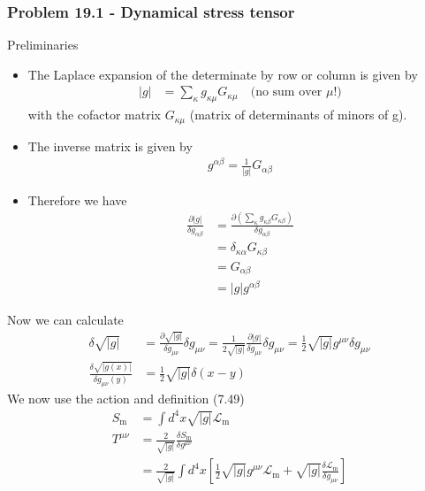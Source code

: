 \documentclass[10pt,a4paper]{article}
\theoremstyle{definition}
\begin{document}
\subsubsection{Problem 19.1 - Dynamical stress tensor}
Preliminaries
\begin{itemize} 
\item The Laplace expansion of the determinate by row or column is given by
\begin{align}
    |g|&=\sum_\kappa g_{\kappa\mu}G_{\kappa\mu}\quad\text{(no sum over $\mu$!)}
\end{align}
with the cofactor matrix $G_{\kappa\mu}$ (matrix of determinants of minors of g).
\item The inverse matrix is given by
\begin{align}
    g^{\alpha\beta}=\frac{1}{|g|}G_{\alpha\beta}
\end{align}
\item Therefore we have
\begin{align}
    \frac{\partial|g|}{\delta g_{\alpha\beta}}
    &=\frac{\partial\left(\sum_\kappa g_{\kappa\beta}G_{\kappa\beta}\right)}{\delta g_{\alpha\beta}}\\
    &=\delta_{\kappa\alpha}G_{\kappa\beta}\\
    &=G_{\alpha\beta}\\
    &=|g|g^{\alpha\beta}
\end{align}
\end{itemize}
Now we can calculate
\begin{align}
    \delta\sqrt{|g|}
    &=\frac{\partial\sqrt{|g|}}{\delta g_{\mu\nu}}\delta g_{\mu\nu}
    =\frac{1}{2\sqrt{|g|}}\frac{\partial|g|}{\delta g_{\mu\nu}}\delta g_{\mu\nu}
    =\frac{1}{2}\sqrt{|g|}g^{\mu\nu}\delta g_{\mu\nu}\\
    \frac{\delta\sqrt{|g(x)|}}{\delta g_{\mu\nu}(y)}
    &=\frac{1}{2}\sqrt{|g|}\delta(x-y)
\end{align}
We now use the action and definition (7.49)
\begin{align}
    S_\text{m}&=\int d^4x\sqrt{|g|}\mathscr{L}_\text{m}\\
    T^{\mu\nu}&=\frac{2}{\sqrt{|g|}}\frac{\delta S_\text{m}}{\delta g^{\mu\nu}}\\
    &=\frac{2}{\sqrt{|g|}}\int d^4x\left[\frac{1}{2}\sqrt{|g|}g^{\mu\nu}\mathscr{L}_\text{m}+\sqrt{|g|}\frac{\delta\mathscr{L}_\text{m}}{\delta g_{\mu\nu}}\right]
\end{align}
\end{document}
